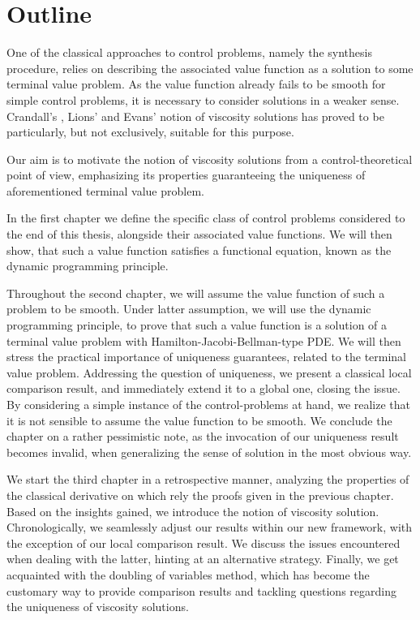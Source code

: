 \chapter*{Outline}

One of the classical approaches to control problems, namely the synthesis procedure, relies on describing the associated value function as a solution to some terminal value problem. As the value function already fails to be smooth for simple control problems, it is necessary to consider solutions in a weaker sense.
Crandall's \cite{lions}, Lions' \cite{lions1982fully, lions1982generalized} and Evans' \cite{crandall1984some} notion of viscosity solutions has proved to be particularly, but not exclusively, suitable for this purpose.

Our aim is to motivate the notion of viscosity solutions from a control-theoretical point of view, emphasizing its properties guaranteeing the uniqueness of aforementioned terminal value problem. 

In the first chapter we define the specific class of control problems considered to the end of this thesis, alongside their associated value functions. We will then show, that such a value function satisfies a functional equation, known as the dynamic programming principle.

Throughout the second chapter, we will assume the value function of such a problem to be smooth. Under latter assumption, we will use the dynamic programming principle, to prove that such a value function is a solution of a terminal value problem with Hamilton-Jacobi-Bellman-type PDE. We will then stress the practical importance of uniqueness guarantees, related to the terminal value problem. Addressing the question of uniqueness, we present a classical local comparison result, and immediately extend it to a global one, closing the issue. By considering a simple instance of the control-problems at hand, we realize that it is not sensible to assume the value function to be smooth. We conclude the chapter on a rather pessimistic note, as the invocation of our uniqueness result becomes invalid, when generalizing the sense of solution in the most obvious way.

We start the third chapter in a retrospective manner, analyzing the properties of the classical derivative on which rely the proofs given in the previous chapter. Based on the insights gained, we introduce the notion of viscosity solution. Chronologically, we seamlessly adjust our results within our new framework, with the exception of our local comparison result. We discuss the issues encountered when dealing with the latter, hinting at an alternative strategy. Finally, we get acquainted with the doubling of variables method, which has become the customary way to provide comparison results and tackling questions regarding the uniqueness of viscosity solutions.

